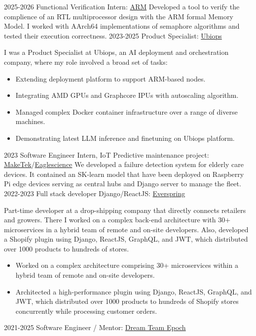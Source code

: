 \documentclass{article}
\begin{document}
\cvitem
{2025-2026}
{Functional Verification Intern:}
{ \href{https://arm.com/}{ARM}}
{
    Developed a tool to verify the complience of an RTL multiprocessor design with the ARM formal Memory Model. I worked with AArch64 implementations of semaphore algorithms and tested their execution correctness.
}
\cvitem
{2023-2025}
{Product Specialist:}
{ \href{https://ubiops.com/}{Ubiops}}
{
I was a Product Specialist at Ubiops, an AI deployment and orchestration company, where my role involved a broad set of tasks: 
\begin{itemize}
\item Extending deployment platform to support ARM-based nodes. 
\item Integrating AMD GPUs and Graphcore IPUs with autoscaling algorithm. 
\item Managed complex Docker container infrastructure over a range of diverse machines. 
\item Demonstrating latest LLM inference and finetuning on Ubiops platform.
\end{itemize}
}
\cvitem
{2023}
{Software Engineer Intern, IoT Predictive maintenance project:}
{ \href{https://www.maketek.nl/}{MakeTek}/\href{https://www.eaglescience.nl/}{Eaglescience}}
{We developed a failure detection system for elderly care devices. It contained an SK-learn model that have been deployed on Raspberry Pi edge devices serving as central hubs and Django server to manage the fleet.}
\cvitem
{2022-2023}
{Full stack developer Django/ReactJS:}
{ \href{https://everspring.app/nl/home}{Everspring}}
{Part-time developer at a drop-shipping company that directly connects retailers and growers. There I worked on a complex back-end architecture with 30+ microservices in a hybrid team of remote and on-site developers. Also, developed a Shopify plugin using Django, ReactJS, GraphQL, and JWT, which distributed over 1000 products to hundreds of stores.
\begin{itemize}
    \item Worked on a complex architecture comprising 30+ microservices within a hybrid team of remote and on-site developers.
    \item Architected a high-performance plugin using Django, ReactJS, GraphQL, and JWT, which distributed over 1000 products to hundreds of Shopify stores concurrently while processing customer orders.
\end{itemize}}
\cvitem
{2021-2025}
{Software Engineer / Mentor:}
{ \href{https://www.teamepoch.net/}{Dream Team Epoch}}
\end{document}
